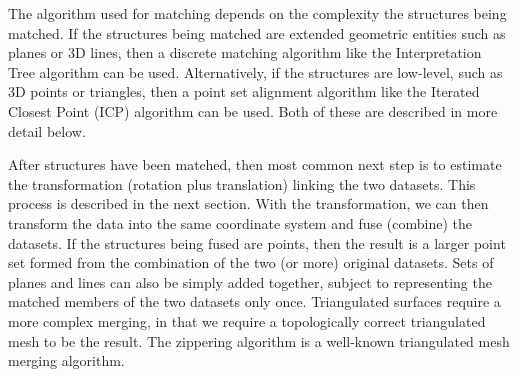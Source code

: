 \documentclass[twocolumn,oneside]{book}
\begin{document}
The algorithm used for matching depends on the complexity
the structures being matched.
If the structures being matched are extended geometric entities such as
planes or 3D lines, then a discrete matching algorithm like the
Interpretation Tree algorithm \cite{grimson} can be used.
Alternatively, if the structures are low-level, such as 3D points 
or triangles, then a point set alignment algorithm like the 
 Iterated Closest Point (ICP) algorithm \cite{besl2} can be used.
Both of these are described in more detail below.

After structures have been matched, then most common next step is
to estimate the transformation (rotation plus translation) linking the
two datasets. This process is described in the next section.
With the transformation, we can then transform the data into the
same coordinate system and fuse (combine) the datasets.
If the structures being fused are points, then the result is a
larger point set formed from the combination of the two (or more) 
original datasets.
Sets of planes and lines can also be simply added together, subject to
representing the matched members of the two datasets only once.
Triangulated surfaces require a more complex merging, in that we require
a topologically correct triangulated mesh to be the result.
The zippering algorithm \cite{turk} is a well-known triangulated 
mesh merging algorithm.
\end{document}

